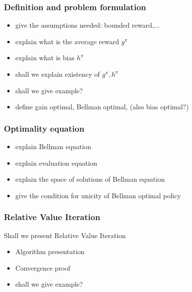 \subsubsection{Definition and problem formulation}

\begin{itemize}
    \item give the assumptions needed: bounded reward,...
    \item explain what is the average reward $g^\pi$
    \item explain what is bias $h^\pi$
    \item shall we explain existency of $g^\pi, h^\pi$
    \item shall we give example?
    \item define gain optimal, Bellman optimal, (also bias optimal?)
\end{itemize}

\subsubsection{Optimality equation}

\begin{itemize}
    \item explain Bellman equation
    \item explain evaluation equation
    \item explain the space of solutions of Bellman equation
    \item give the condition for unicity of Bellman optimal policy
\end{itemize}

\subsubsection{Relative Value Iteration}

Shall we present Relative Value Iteration

\begin{itemize}
    \item Algorithm presentation
    \item Convergence proof
    \item shall we give example?
\end{itemize}
